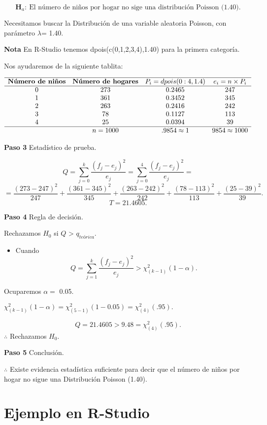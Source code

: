 \documentclass[
  a4paper,
  oneside,
  openany]{book}
\providecommand{\tightlist}{%
  \setlength{\itemsep}{0pt}\setlength{\parskip}{0pt}}
\begin{document}
\[\textbf{H}_a: \ \mbox{El número de niños por hogar no sige una distribución Poisson (1.40).}\]

Necesitamos buscar la Distribución de una variable aleatoria Poisson, con parámetro \(\lambda\)= 1.40.

\textbf{Nota} En R-Studio tenemos dpois(c(0,1,2,3,4),1.40) para la primera categoría.

Nos ayudaremos de la siguiente tablita:

\[
\begin{array}{c c c c c}
\hline
\textbf{Número de niños} & \textbf{Número de hogares} & P_{i}=dpois(0:4,1.4) & e_i=n \times P_i \\
\hline
0&273&0.2465&247 \\
1&361&0.3452&345 \\
2&263&0.2416&242 \\
3&78&0.1127&113 \\
4&25&0.0394&39 \\
\hline
&n=1000&.9854\approx1 &9854\approx1000 \\
\end{array}
\]

\textbf{Paso 3} Estadístico de prueba.

\[Q=\sum_{j=0}^{k}\frac{(f_{j}-e_{j})^2}{e_{j}}=\sum_{j=0}^{4}\frac{(f_{j}-e_{j})^2}{e_{j}}=\]
\[=\frac{(273-247)^2}{247}+\frac{(361-345)^2}{345}+\frac{(263-242)^2}{242}+\frac{(78-113)^2}{113}+\frac{(25-39)^2}{39}.\]
\[T=21.4605.\]

\textbf{Paso 4} Regla de decisión.

Rechazamos \(H_0\) si \(Q\) \textgreater{} \(q_{teórica}.\)

\begin{itemize}
\tightlist
\item
  Cuando \[Q= \sum_{j=1}^{k}\frac{(f_{j}-e_{j})^2}{e_{j}} > \chi^2_{(k-1)}(1-\alpha).\]
\end{itemize}

Ocuparemos \(\alpha=\) 0.05.

\(\chi^2_{(k-1)}(1-\alpha)=\chi^2_{(5-1)}(1-0.05) =\chi^2_{(4)}(.95).\)

\[ Q=21.4605 > 9.48= \chi^2_{(4)}(.95).\]
\(\therefore\) Rechazamos \(H_0\).

\textbf{Paso 5} Conclusión.

\(\therefore\) Existe evidencia estadística suficiente para decir que el número de niños por hogar no sigue una Distribución Poisson (1.40).

\hypertarget{ejemplo-en-r-studio-13}{%
\section{Ejemplo en R-Studio}\label{ejemplo-en-r-studio-13}}
\end{document}
